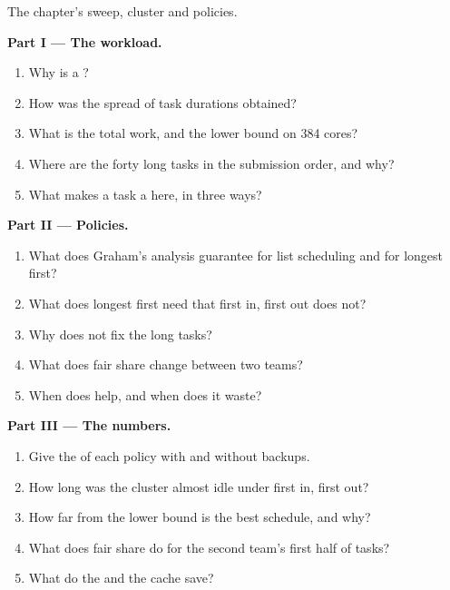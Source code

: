 \begin{problem}\label{pb:pl:distributed-compute-and-schedulers:1}
The chapter's sweep, cluster and policies.

\medskip\noindent\textbf{Part I --- The workload.}
\begin{enumerate}
\item Why is a  ?
\item How was the spread of task durations obtained?
\item What is the total work, and the lower bound on 384 cores?
\item Where are the forty long tasks in the submission order, and why?
\item What makes a task a  here, in three ways?
\end{enumerate}

\medskip\noindent\textbf{Part II --- Policies.}
\begin{enumerate}[resume]
\item What does Graham's analysis guarantee for list scheduling and for longest first?
\item What does longest first need that first in, first out does not?
\item Why does  not fix the long tasks?
\item What does fair share change between two teams?
\item When does  help, and when does it waste?
\end{enumerate}

\medskip\noindent\textbf{Part III --- The numbers.}
\begin{enumerate}[resume]
\item Give the  of each policy with and without backups.
\item How long was the cluster almost idle under first in, first out?
\item How far from the lower bound is the best schedule, and why?
\item What does fair share do for the second team's first half of tasks?
\item What do the  and the cache save?
\end{enumerate}


\end{problem}
